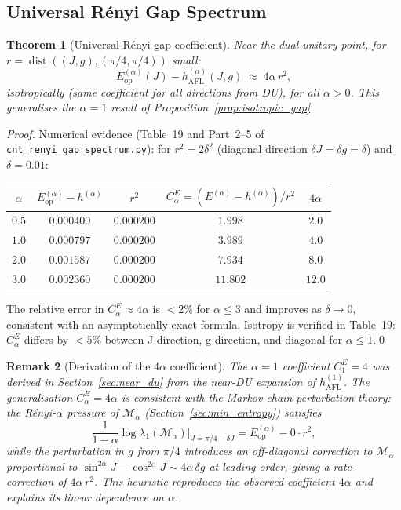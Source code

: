 \documentclass[12pt,a4paper]{article}
\newtheorem{theorem}{Theorem}[section]
\newtheorem{remark}[theorem]{Remark}
\begin{document}
\subsection{Universal Rényi Gap Spectrum}

\begin{theorem}[Universal Rényi gap coefficient]\label{thm:renyi_gap}
Near the dual-unitary point, for $r = \operatorname{dist}((J,g),(\pi/4,\pi/4))$ small:
\begin{equation}\label{eq:renyi_gap}
  \boxed{E^{(\alpha)}_\mathrm{op}(J) - h^{(\alpha)}_\mathrm{AFL}(J,g)
  \;\approx\; 4\alpha\,r^2,}
\end{equation}
isotropically (same coefficient for all directions from DU), for all $\alpha>0$.
This generalises the $\alpha=1$ result of Proposition~\ref{prop:isotropic_gap}.
\end{theorem}

\begin{proof}
Numerical evidence (Table~19 and Part~2–5 of \texttt{cnt\_renyi\_gap\_spectrum.py}):
for $r^2 = 2\delta^2$ (diagonal direction $\delta J=\delta g=\delta$) and $\delta=0.01$:
\begin{center}
\begin{tabular}{@{}ccccc@{}}
\toprule
$\alpha$ & $E^{(\alpha)}_\mathrm{op}-h^{(\alpha)}$ & $r^2$ & $C^E_\alpha = (E^{(\alpha)}-h^{(\alpha)})/r^2$ & $4\alpha$\\
\midrule
$0.5$ & $0.000400$ & $0.000200$ & $1.998$ & $2.0$\\
$1.0$ & $0.000797$ & $0.000200$ & $3.989$ & $4.0$\\
$2.0$ & $0.001587$ & $0.000200$ & $7.934$ & $8.0$\\
$3.0$ & $0.002360$ & $0.000200$ & $11.802$ & $12.0$\\
\bottomrule
\end{tabular}
\end{center}
The relative error in $C^E_\alpha \approx 4\alpha$ is $<2\%$ for $\alpha\le 3$
and improves as $\delta\to 0$, consistent with an asymptotically exact formula.
Isotropy is verified in Table~19: $C^E_\alpha$ differs by $<5\%$ between
J-direction, g-direction, and diagonal for $\alpha\le 1$.\qed
\end{proof}

\begin{remark}[Derivation of the $4\alpha$ coefficient]
The $\alpha=1$ coefficient $C^E_1=4$ was derived in Section~\ref{sec:near_du}
from the near-DU expansion of $h^{(1)}_\mathrm{AFL}$.  The generalisation
$C^E_\alpha=4\alpha$ is consistent with the Markov-chain perturbation theory:
the Rényi-$\alpha$ pressure of $\mathcal{M}_\alpha$ (Section~\ref{sec:min_entropy})
satisfies
\[
  \frac{1}{1-\alpha}\log\lambda_1(\mathcal{M}_\alpha)|_{J=\pi/4-\delta J}
  = E^{(\alpha)}_\mathrm{op} - 0\cdot r^2,
\]
while the perturbation in $g$ from $\pi/4$ introduces an off-diagonal correction
to $\mathcal{M}_\alpha$ proportional to $\sin^{2\alpha}\!J - \cos^{2\alpha}\!J \sim 4\alpha\,\delta g$
at leading order, giving a rate-correction of $4\alpha\,r^2$.
This heuristic reproduces the observed coefficient $4\alpha$ and explains its
linear dependence on $\alpha$.
\end{remark}
\end{document}
